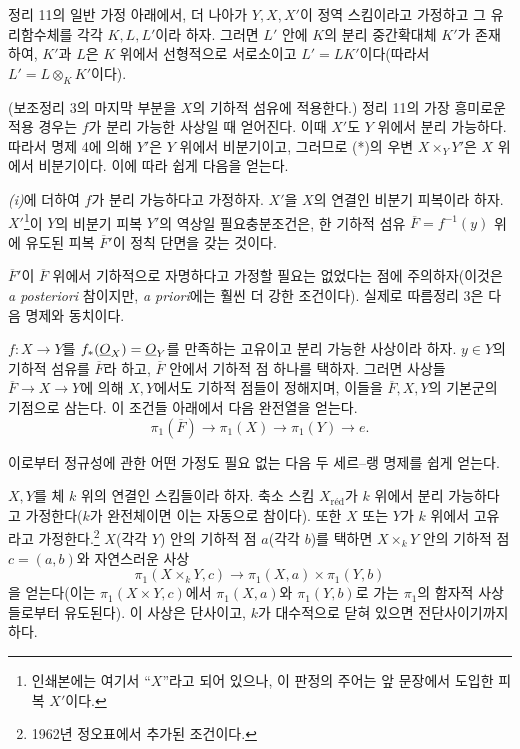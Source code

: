  정리 11의 일반 가정 아래에서, 더 나아가
$Y,X,X'$이 정역 스킴이라고 가정하고 그 유리함수체를 각각 $K,L,L'$이라
하자. 그러면 $L'$ 안에 $K$의 분리 중간확대체 $K'$가 존재하여, $K'$과
$L$은 $K$ 위에서 선형적으로 서로소이고 $L'=LK'$이다(따라서
$L'=L\otimes_K K'$이다).

(보조정리 3의 마지막 부분을 $X$의 기하적 섬유에 적용한다.) 정리 11의
가장 흥미로운 적용 경우는 $f$가 분리 가능한 사상일 때 얻어진다. 이때
$X'$도 $Y$ 위에서 분리 가능하다. 따라서 명제 4에 의해 $Y'$은 $Y$ 위에서
비분기이고, 그러므로 (*)의 우변 $X\times_Y Y'$은 $X$ 위에서 비분기이다.
이에 따라 쉽게 다음을 얻는다.

 \textit{(i)}에 더하여 $f$가 분리 가능하다고 가정하자.
$X'$을 $X$의 연결인 비분기 피복이라 하자. $X'$\footnote{인쇄본에는
여기서 ``$X$''라고 되어 있으나, 이 판정의 주어는 앞 문장에서 도입한
피복 $X'$이다.}이 $Y$의 비분기 피복 $Y'$의 역상일 필요충분조건은, 한
기하적 섬유 $\overline F=f^{-1}(y)$ 위에 유도된 피복 $\overline F'$이
정칙 단면을 갖는 것이다.

$\overline F'$이 $\overline F$ 위에서 기하적으로 자명하다고 가정할 필요는
없었다는 점에 주의하자(이것은 \textit{a posteriori} 참이지만,
\textit{a priori}에는 훨씬 더 강한 조건이다). 실제로 따름정리 3은 다음
명제와 동치이다.

 $f:X\longrightarrow Y$를
$f_*(\underline{O}_X)=\underline{O}_Y$를 만족하는 고유이고 분리 가능한 사상이라 하자.
$y\in Y$의 기하적 섬유를 $\overline F$라 하고, $\overline F$ 안에서
기하적 점 하나를 택하자. 그러면 사상들
$\overline F\longrightarrow X\longrightarrow Y$에 의해 $X,Y$에서도
기하적 점들이 정해지며, 이들을 $\overline F,X,Y$의 기본군의 기점으로
삼는다. 이 조건들 아래에서 다음 완전열을 얻는다.
\[
  \boxed{
    \pi_1(\overline F)\longrightarrow\pi_1(X)
    \longrightarrow\pi_1(Y)\longrightarrow e
  }.
\]

이로부터 정규성에 관한 어떤 가정도 필요 없는 다음 두 세르--랭 명제를
쉽게 얻는다.

 $X,Y$를 체 $k$ 위의 연결인 스킴들이라 하자. 축소
스킴 $X_{\mathrm{réd}}$가 $k$ 위에서 분리 가능하다고 가정한다($k$가
완전체이면 이는 자동으로 참이다). 또한 $X$ 또는 $Y$가 $k$ 위에서
고유라고 가정한다.\footnote{1962년 정오표에서 추가된 조건이다.} $X$(각각
$Y$) 안의 기하적 점 $a$(각각 $b$)를 택하면 $X\times_kY$ 안의 기하적 점
$c=(a,b)$와 자연스러운 사상
\[
  \pi_1(X\times_kY,c)\longrightarrow
  \pi_1(X,a)\times\pi_1(Y,b)
\]
을 얻는다(이는 $\pi_1(X\times Y,c)$에서 $\pi_1(X,a)$와
$\pi_1(Y,b)$로 가는 $\pi_1$의 함자적 사상들로부터 유도된다). 이 사상은
단사이고, $k$가 대수적으로 닫혀 있으면 전단사이기까지 하다.

